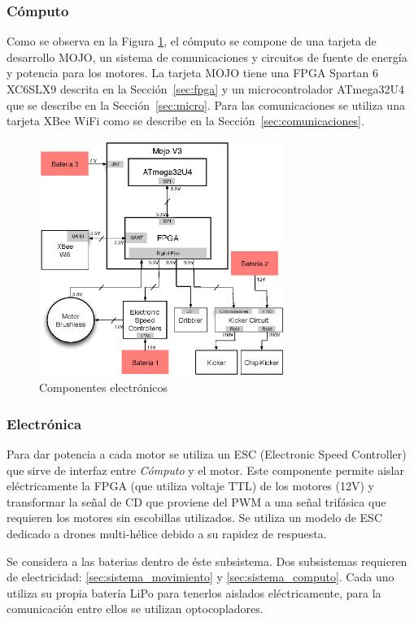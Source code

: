 \documentclass[twocolumn,10pt]{amrob}
\begin{document}
\subsubsection*{Cómputo}
\label{sec:sistema_computo}
Como se observa en la Figura \ref{fig:electGral}, el cómputo se compone de una tarjeta de desarrollo MOJO, un sistema de comunicaciones y circuitos de fuente de energía y potencia para los motores. La tarjeta MOJO tiene una FPGA Spartan 6 XC6SLX9 descrita en la Sección~\ref{sec:fpga} y un microcontrolador ATmega32U4 que se describe en la Sección~\ref{sec:micro}. Para las comunicaciones se utiliza una tarjeta XBee WiFi como se describe en la Sección~\ref{sec:comunicaciones}. 
\begin{figure}
  \centering
    \includegraphics[width=8cm]{diagElectronica.eps}
  \caption{Componentes electrónicos}
  \label{fig:electGral}
\end{figure}

\subsubsection*{Electrónica}
Para dar potencia a cada motor se utiliza un ESC (Electronic Speed Controller) que sirve de interfaz entre \emph{Cómputo}  y el motor. Este componente permite aislar eléctricamente la FPGA (que utiliza voltaje TTL) de los motores (12V) y transformar la señal de CD que proviene del PWM a una señal trifásica que requieren los motores sin escobillas utilizados. Se utiliza un modelo de ESC dedicado a drones multi-hélice debido a su rapidez de respuesta. 

Se considera a las baterias dentro de éste subsistema. Dos subsistemas requieren de electricidad: \ref{sec:sistema_movimiento} y \ref{sec:sistema_computo}. Cada uno utiliza su propia batería LiPo para tenerlos aislados eléctricamente, para la comunicación entre ellos se utilizan optocopladores. 
\end{document}
